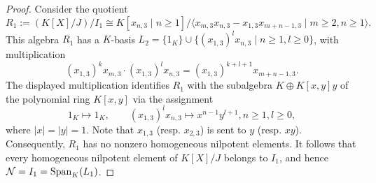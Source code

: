 \documentclass[10pt, reqno]{amsart}
\theoremstyle{definition}
\theoremstyle{remark}
\numberwithin{equation}{section}
\begin{document}
\begin{proof}
Consider the quotient
\[ 
    R_1:=(K[X]/J)/I_1
    \cong K[x_{n,3} \mid n\ge 1]/\langle x_{m,3}x_{n,3}-x_{1,3}x_{m+n-1,3} \mid m\ge 2, n \ge 1 \rangle.
\]
This algebra $R_1$ has a $K$-basis \(L_2=\{1_K\}\cup\{(x_{1,3})^l x_{n,3}\mid n\ge1, l\ge0\}\), with multiplication
\[(x_{1,3})^kx_{m,3}\cdot (x_{1,3})^lx_{n,3} = (x_{1,3})^{k+l+1}x_{m+n-1,3}.\]  
 The displayed multiplication identifies $R_1$ with the subalgebra $K\oplus K[x,y]y$ of the polynomial ring $K[x,y]$ via the assignment
    \[
    1_K\mapsto 1_K,\qquad (x_{1,3})^l x_{n,3}\mapsto x^{n-1}y^{l+1}, n\geq 1, l\geq 0,
    \] 
where \(|x|=|y|=1\). Note that $x_{1,3}$ (resp. $x_{2,3}$) is sent to $y$ (resp. $xy$). Consequently, $R_1$
has no nonzero homogeneous nilpotent elements. It follows that every homogeneous nilpotent element of $K[X]/J$ belongs to $I_1$, and hence
$\mathcal{N}=I_1=\mathrm{Span}_K(L_1)$.
\end{proof}
\end{document}
